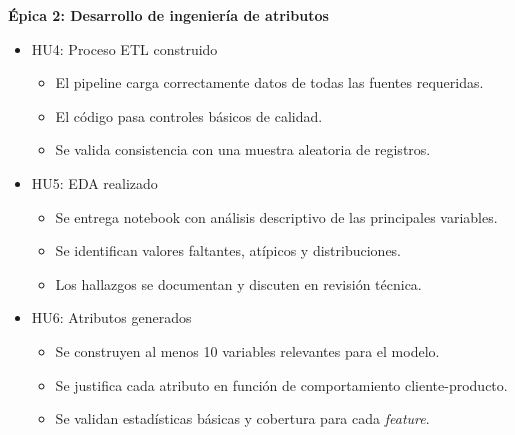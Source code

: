 \documentclass[
11pt, %
]{charter}
\begin{document}
\textbf{\'Epica 2: Desarrollo de ingenier\'ia de atributos}
\begin{itemize}
  \item HU4: Proceso ETL construido
  \begin{itemize}
    \item El pipeline carga correctamente datos de todas las fuentes requeridas.
    \item El código pasa controles básicos de calidad.
    \item Se valida consistencia con una muestra aleatoria de registros.
  \end{itemize}
  \item HU5: EDA realizado
  \begin{itemize}
    \item Se entrega notebook con análisis descriptivo de las principales variables.
    \item Se identifican valores faltantes, atípicos y distribuciones.
    \item Los hallazgos se documentan y discuten en revisión técnica.
  \end{itemize}
  \item HU6: Atributos generados
  \begin{itemize}
    \item Se construyen al menos 10 variables relevantes para el modelo.
    \item Se justifica cada atributo en función de comportamiento cliente-producto.
    \item Se validan estadísticas básicas y cobertura para cada \textit{feature}.
  \end{itemize}
\end{itemize}
\end{document}
